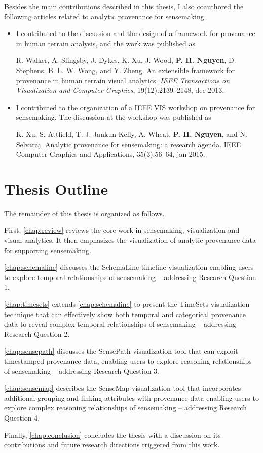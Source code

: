Besides the main contributions described in this thesis, I also coauthored the following articles related to analytic provenance for sensemaking.

\begin{itemize}
	\item I contributed to the discussion and the design of a framework for provenance in human terrain analysis, and the work was published as

	\qquad R. Walker, A. Slingsby, J. Dykes, K. Xu, J. Wood, \textbf{P. H. Nguyen}, D. Stephens, B. L. W. Wong, and Y. Zheng. An extensible framework for provenance in human terrain visual analytics. \textit{IEEE Transactions on Visualization and Computer Graphics}, 19(12):2139--2148, dec 2013.

	\item I contributed to the organization of a IEEE VIS workshop on provenance for sensemaking. The discussion at the workshop was published as

	\qquad K. Xu, S. Attfield, T. J. Jankun-Kelly, A. Wheat, \textbf{P. H. Nguyen}, and N. Selvaraj. Analytic provenance for sensemaking: a research agenda. IEEE Computer Graphics and Applications, 35(3):56--64, jan 2015.
\end{itemize}

\section{Thesis Outline}
The remainder of this thesis is organized as follows.

First, \autoref{chap:review} reviews the core work in sensemaking, visualization and visual analytics. It then emphasizes the visualization of analytic provenance data for supporting sensemaking.

\autoref{chap:schemaline} discusses the SchemaLine timeline visualization enabling users to explore temporal relationships of sensemaking -- addressing Research Question 1.

\autoref{chap:timesets} extends \autoref{chap:schemaline} to present the TimeSets visualization technique that can effectively show both temporal and categorical provenance data to reveal complex temporal relationships of sensemaking -- addressing Research Question 2.

\autoref{chap:sensepath} discusses the SensePath visualization tool that can exploit timestamped provenance data, enabling users to explore reasoning relationships of sensemaking -- addressing Research Question 3.

\autoref{chap:sensemap} describes the SenseMap visualization tool that incorporates additional grouping and linking attributes with provenance data enabling users to explore complex reasoning relationships of sensemaking -- addressing Research Question 4.

Finally, \autoref{chap:conclusion} concludes the thesis with a discussion on its contributions and future research directions triggered from this work.